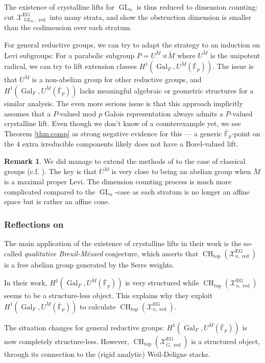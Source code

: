 \documentclass[11pt]{amsart}
\newcommand{\MINOREDITED}[1]{#1}
\theoremstyle{definition}
\newtheorem{remark}[thm]{Remark}
\newcommand{\bFp}{\bar{\mathbb{F}}_p}
\newcommand{\cX}{\mathcal{X}}
\newcommand{\bG}{\breve{G}}
\newcommand{\bM}{\breve{M}}
\newcommand{\CH}{{\operatorname{CH}}}
\newcommand{\Top}{{\operatorname{top}}}
\DeclareMathOperator{\EG}{EG}
\DeclareMathOperator{\GL}{GL}
\DeclareMathOperator{\red}{red}
\DeclareMathOperator{\Gal}{Gal}
\begin{document}
\noindent
The existence of crystalline lifts for $\GL_n$
is thus reduced to dimension counting:
cut $\cX^{\EG}_{\GL_n, \red}$
into many strata, and show
the obstruction dimension
is smaller than the codimension
over each stratum.

For general reductive groups,
we can try to adapt the strategy
to an induction on Levi subgroups:
For a parabolic subgroup $P=U^{\bM}\rtimes\bM$
where $U^{\bM}$ is the unipotent radical,
we can try to lift extension classes
$H^1(\Gal_F, U^{\bM}(\bFp))$.
The issue is that $U^{\bM}$ is a non-abelian group
for other reductive groups,
and $H^1(\Gal_F, U^{\bM}(\bFp))$
lacks meaningful algebraic or geometric structures
for a similar analysis.
The even more serious issue
is that this approach
implicitly assumes
that a $P$-valued mod $p$ Galois representation
always admits a $P$-valued crystalline lift.
Even though we don't know of a counterexample yet,
we see
Theorem \ref{thm:comp}
as \MINOREDITED{strong negative evidence for this} ---
a generic $\bFp$-point on the $4$ extra
irreducible components likely does not
have a Borel-valued lift.


\begin{remark}
We did manage to extend the methods
of \cite{EG23} to the case of classical groups (c.f. \cite{Lin25B}).
The key is that $U^{\bM}$ is very close to being
an abelian group
when $\bM$ is a maximal proper Levi.
The dimension counting process is much more complicated
compared to the $\GL_n$-case
as \MINOREDITED{each stratum is} no longer an affine space
but is rather an affine cone.
\end{remark}

\subsubsection{Reflections on \cite{EG23}}
The main application
of the existence of crystalline lifts in their work
is the so-called {\it qualitative Breuil-M\'ezard}
conjecture,
\MINOREDITED{which asserts that}
$\CH_{\Top}(\cX_{n,\red}^{\EG})$
is \MINOREDITED{a} free abelian group generated by the Serre weights.

In their work,
$H^1(\Gal_F, U^{\bM}(\bFp))$
is very structured while
$\CH_{\Top}(\cX_{n,\red}^{\EG})$
seems to be a structure-less object.
This explains why they 
exploit $H^1(\Gal_F, U^{\bM}(\bFp))$
to calculate 
$\CH_{\Top}(\cX_{n,\red}^{\EG})$.

The situation changes for general reductive groups:
$H^1(\Gal_F, U^{\bM}(\bFp))$
is now completely structure-less.
However, 
$\CH_{\Top}(\cX_{\bG,\red}^{\EG})$
is a structured object,
through its connection to the (rigid analytic)
Weil-Deligne stacks.
\end{document}
